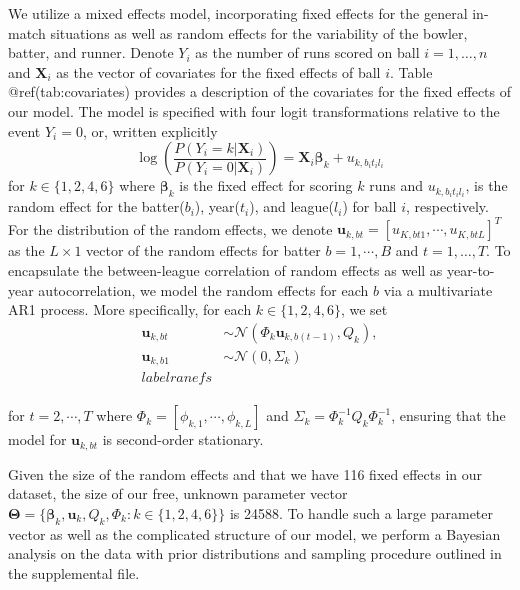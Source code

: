 \documentclass[
  12pt,
]{article}
\begin{document}
We utilize a mixed effects model, incorporating fixed effects for the
general in-match situations as well as random effects for the
variability of the bowler, batter, and runner. Denote \(Y_i\) as the
number of runs scored on ball \(i = 1,\dots,n\) and \(\boldsymbol{X}_i\)
as the vector of covariates for the fixed effects of ball \(i\). Table
@ref(tab:covariates) provides a description of the covariates for the
fixed effects of our model. The model is specified with four logit
transformations relative to the event \(Y_i = 0\), or, written
explicitly \begin{equation}
\log\left(\frac{P(Y_i = k | \boldsymbol{X}_i)}{P(Y_i = 0 | \boldsymbol{X}_i)}\right) = \boldsymbol{X}_i \boldsymbol{\beta}_k + u_{k, b_it_il_i} \label{model}
\end{equation} for \(k \in \{1,2,4,6\}\) where \(\boldsymbol{\beta}_k\)
is the fixed effect for scoring \(k\) runs and \(u_{k,b_it_il_i}\), is
the random effect for the batter(\(b_i\)), year(\(t_i\)), and
league(\(l_i\)) for ball \(i\), respectively. For the distribution of
the random effects, we denote
\(\boldsymbol{u}_{k,bt} = [u_{K,bt1},\cdots,u_{K,btL}]^T\) as the
\(L \times 1\) vector of the random effects for batter
\(b = 1,\cdots,B\) and \(t = 1,\dots,T\). To encapsulate the
between-league correlation of random effects as well as year-to-year
autocorrelation, we model the random effects for each \(b\) via a
multivariate AR1 process. More specifically, for each
\(k \in \{1,2,4,6\}\), we set \begin{align}
\boldsymbol{u}_{k,bt} & \sim \mathcal{N}(\Phi_k\boldsymbol{u}_{k,b(t-1)},Q_k), \nonumber \\ 
\boldsymbol{u}_{k,b1} & \sim \mathcal{N}(0,\Sigma_k)\\label{ranefs}\\
\end{align}

for \(t = 2,\cdots,T\) where \(\Phi_k = [\phi_{k,1},\cdots,\phi_{k,L}]\)
and \(\Sigma_k = \Phi_k^{-1}Q_k\Phi_k^{-1}\), ensuring that the model
for \(\boldsymbol{u}_{k,bt}\) is second-order stationary.

Given the size of the random effects and that we have 116 fixed effects
in our dataset, the size of our free, unknown parameter vector
\(\boldsymbol{\Theta} = \{\boldsymbol{\beta}_k, \boldsymbol{u}_k,Q_k,\Phi_k: k \in \{1,2,4,6\}\}\)
is 24588. To handle such a large parameter vector as well as the
complicated structure of our model, we perform a Bayesian analysis on
the data with prior distributions and sampling procedure outlined in the
supplemental file.
\end{document}
